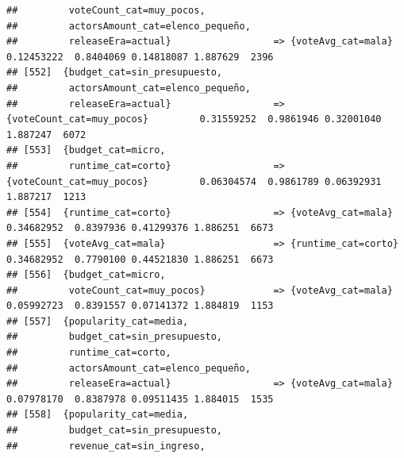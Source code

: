 \documentclass[
]{article}
\begin{document}
\begin{verbatim}
##         voteCount_cat=muy_pocos,                                                                                                
##         actorsAmount_cat=elenco_pequeño,                                                                                        
##         releaseEra=actual}                  => {voteAvg_cat=mala}                0.12453222  0.8404069 0.14818087 1.887629  2396
## [552]  {budget_cat=sin_presupuesto,                                                                                             
##         actorsAmount_cat=elenco_pequeño,                                                                                        
##         releaseEra=actual}                  => {voteCount_cat=muy_pocos}         0.31559252  0.9861946 0.32001040 1.887247  6072
## [553]  {budget_cat=micro,                                                                                                       
##         runtime_cat=corto}                  => {voteCount_cat=muy_pocos}         0.06304574  0.9861789 0.06392931 1.887217  1213
## [554]  {runtime_cat=corto}                  => {voteAvg_cat=mala}                0.34682952  0.8397936 0.41299376 1.886251  6673
## [555]  {voteAvg_cat=mala}                   => {runtime_cat=corto}               0.34682952  0.7790100 0.44521830 1.886251  6673
## [556]  {budget_cat=micro,                                                                                                       
##         voteCount_cat=muy_pocos}            => {voteAvg_cat=mala}                0.05992723  0.8391557 0.07141372 1.884819  1153
## [557]  {popularity_cat=media,                                                                                                   
##         budget_cat=sin_presupuesto,                                                                                             
##         runtime_cat=corto,                                                                                                      
##         actorsAmount_cat=elenco_pequeño,                                                                                        
##         releaseEra=actual}                  => {voteAvg_cat=mala}                0.07978170  0.8387978 0.09511435 1.884015  1535
## [558]  {popularity_cat=media,                                                                                                   
##         budget_cat=sin_presupuesto,                                                                                             
##         revenue_cat=sin_ingreso,                                                                                                

\end{verbatim}
\end{document}
